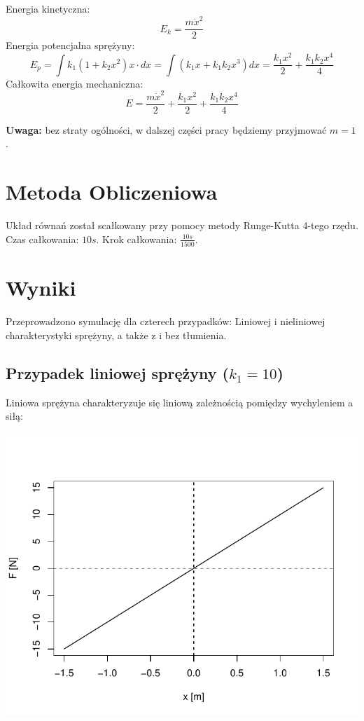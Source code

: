 \documentclass[12pt]{sprawozdanie}
\begin{document}
Energia kinetyczna: \[E_k = \frac{m\dot x^2}{2}\] Energia potencjalna
sprężyny:
\[E_p = \int k_1(1+k_2x^2)x\cdot dx = \int \left(k_1x+k_1k_2x^3\right)dx = \frac{k_1x^2}{2}+\frac{k_1k_2x^4}{4}\]
Całkowita energia mechaniczna:
\[E = \frac{m\dot x^2}{2} + \frac{k_1x^2}{2}+\frac{k_1k_2x^4}{4}\]

\textbf{Uwaga:} bez straty ogólności, w dalszej części pracy będziemy
przyjmować \(m=1\).

\hypertarget{metoda-obliczeniowa}{%
\section{Metoda Obliczeniowa}\label{metoda-obliczeniowa}}

Układ równań został scałkowany przy pomocy metody Runge-Kutta 4-tego
rzędu. Czas całkowania: \(10s\). Krok całkowania: \(\frac{10s}{1500}\).

\hypertarget{wyniki}{%
\section{Wyniki}\label{wyniki}}

Przeprowadzono symulację dla czterech przypadków: Liniowej i nieliniowej
charakterystyki sprężyny, a także z i bez tłumienia.

\hypertarget{przypadek-liniowej-sprezyny-k_110}{%
\subsection{\texorpdfstring{Przypadek liniowej sprężyny
(\(k_1=10\))}{Przypadek liniowej sprężyny (k\_1=10)}}\label{przypadek-liniowej-sprezyny-k_110}}

Liniowa sprężyna charakteryzuje się liniową zależnością pomiędzy
wychyleniem a siłą:

\begin{center}\includegraphics{info2_files/figure-latex/linear-characteristic-1} \end{center}
\end{document}
